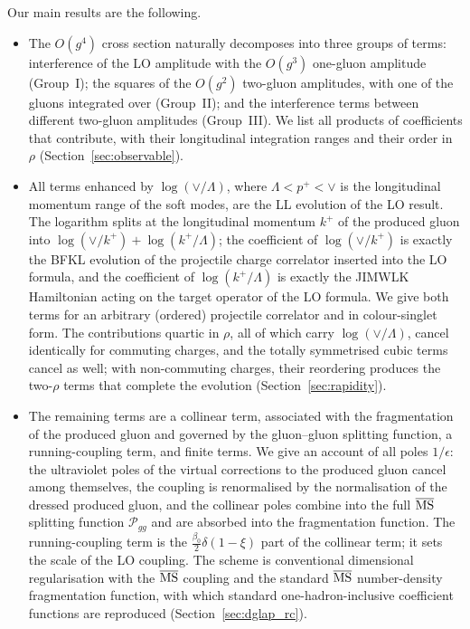 Our main results are the following.
\begin{itemize}
\item The $O(g^4)$ cross section naturally decomposes into three groups of terms: interference of the LO amplitude with the $O(g^3)$ one-gluon amplitude (Group~I); the squares of the $O(g^2)$ two-gluon amplitudes, with one of the gluons integrated over (Group~II); and the interference terms between different two-gluon amplitudes (Group~III). We list all products of coefficients that contribute, with their longitudinal integration ranges and their order in $\rho$ (Section~\ref{sec:observable}).
\item All terms enhanced by $\log(\vee/\Lambda)$, where $\Lambda<p^+<\vee$ is the longitudinal momentum range of the soft modes, are the LL evolution of the LO result. The logarithm splits at the longitudinal momentum $k^+$ of the produced gluon into $\log(\vee/k^+)+\log(k^+/\Lambda)$; the coefficient of $\log(\vee/k^+)$ is exactly the BFKL evolution of the projectile charge correlator inserted into the LO formula, and the coefficient of $\log(k^+/\Lambda)$ is exactly the JIMWLK Hamiltonian acting on the target operator of the LO formula. We give both terms for an arbitrary (ordered) projectile correlator and in colour-singlet form. The contributions quartic in $\rho$, all of which carry $\log(\vee/\Lambda)$, cancel identically for commuting charges, and the totally symmetrised cubic terms cancel as well; with non-commuting charges, their reordering produces the two-$\rho$ terms that complete the evolution (Section~\ref{sec:rapidity}).
\item The remaining terms are a collinear term, associated with the fragmentation of the produced gluon and governed by the gluon--gluon splitting function, a running-coupling term, and finite terms. We give an account of all poles $1/\epsilon$: the ultraviolet poles of the virtual corrections to the produced gluon cancel among themselves, the coupling is renormalised by the normalisation of the dressed produced gluon, and the collinear poles combine into the full $\overline{\rm MS}$ splitting function $\mathcal P_{gg}$ and are absorbed into the fragmentation function. The running-coupling term is the $\frac{\beta_0}{2}\delta(1-\xi)$ part of the collinear term; it sets the scale of the LO coupling. The scheme is conventional dimensional regularisation with the $\overline{\rm MS}$ coupling and the standard $\overline{\rm MS}$ number-density fragmentation function, with which standard one-hadron-inclusive coefficient functions are reproduced (Section~\ref{sec:dglap_rc}).

\end{itemize}
